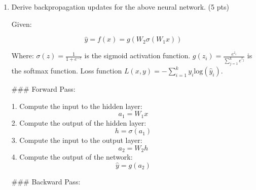 \documentclass[a4paper]{article}
\theoremstyle{definition}
\newenvironment{soln}{
    \leavevmode\color{blue}\ignorespaces
}{}
\begin{document}
\begin{enumerate}
    \item Derive backpropagation updates for the above neural network. (5 pts)\\
    
    \begin{soln}
        Given:

        \[
        \hat{y} = f(x) = g(W_2\sigma(W_1x))
        \]
        
        Where:
        \( \sigma(z) = \frac{1}{1 + e^{-z}} \) is the sigmoid activation function.
        \( g(z_i) = \frac{e^{z_i}}{\sum_{j=1}^k e^{z_j}} \) is the softmax function.
        Loss function \( L(x, y) = -\sum_{i=1}^k y_i \text{log}(\hat{y}_i) \).
        
        ### Forward Pass:
        
        1. Compute the input to the hidden layer:
        \[
        a_1 = W_1x
        \]
        2. Compute the output of the hidden layer:
        \[
        h = \sigma(a_1)
        \]
        3. Compute the input to the output layer:
        \[
        a_2 = W_2h
        \]
        4. Compute the output of the network:
        \[
        \hat{y} = g(a_2)
        \]
        
        ### Backward Pass:
        

\end{soln}
\end{enumerate}
\end{document}
